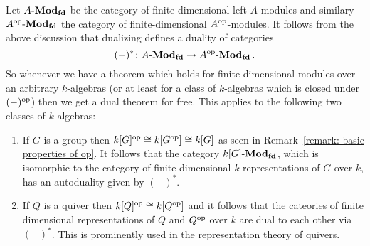 \begin{example}
  Let $A\text{-}\mathbf{Mod}_{\mathbf{fd}}$ be the category of finite-dimensional left $A$-modules and similary $A^{\mathrm{op}}\text{-}\mathbf{Mod}_{\mathbf{fd}}$ the category of finite-dimensional $A^{\mathrm{op}}$-modules.
  It follows from the above discussion that dualizing defines a duality of categories
  \[
            (-)^*
    \colon  A\text{-}\mathbf{Mod}_{\mathbf{fd}}
    \to     A^{\mathrm{op}}\text{-}\mathbf{Mod}_{\mathbf{fd}} \,.
  \]
  So whenever we have a theorem which holds for finite-dimensional modules over an arbitrary $k$-algebras (or at least for a class of $k$-algebras which is closed under $(-)^{\mathrm{op}}$) then we get a dual theorem for free.
  This applies to the following two classes of $k$-algebras:
  \begin{enumerate}
    \item
      If $G$ is a group then $k[G]^{\mathrm{op}} \cong k[G^{\mathrm{op}}] \cong k[G]$ as seen in Remark~\ref{remark: basic properties of op}.
      It follows that the category $k[G]\text{-}\mathbf{Mod}_{\mathbf{fd}}$, which is isomorphic to the category of finite dimensional $k$-representations of $G$ over $k$, has an autoduality given by $(-)^*$.
    \item
      If $Q$ is a quiver then $k[Q]^{\mathrm{op}} \cong k[Q^{\mathrm{op}}]$ and it follows that the cateories of finite dimensional representations of $Q$ and $Q^{\mathrm{op}}$ over $k$ are dual to each other via $(-)^*$.
      This is prominently used in the representation theory of quivers.
  \end{enumerate}
\end{example}




